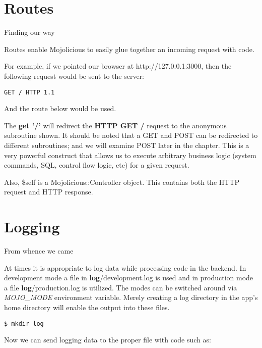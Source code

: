 \documentclass[14pt]{extreport}
\begin{document}
\section{Routes}

{\Large Finding our way}

Routes enable Mojolicious to easily glue together an incoming request with
code.

For example, if we pointed our browser at http://127.0.0.1:3000, then the
following request would be sent to the server:

\begin{lstlisting}[style=BlockStyle]
    GET / HTTP 1.1
\end{lstlisting}

And the route below would be used.



The \textbf{get '/'} will redirect the \textbf{HTTP GET /} request to the
anonymous subroutine shown. It should be noted that a GET and POST can be
redirected to different subroutines; and we will examine POST later in the
chapter.  This is a very powerful construct that allows us to execute arbitrary
business logic (system commands, SQL, control flow logic, etc) for a given
request.

Also, \$self is a Mojolicious::Controller object.  This contains both the HTTP
request and HTTP response.

\section{Logging}

{\Large From whence we came}

At times it is appropriate to log data while processing code in the backend.
In development mode a file in \textbf{log}/development.log is used and in
production mode a file \textbf{log}/production.log is utilized. The modes can
be switched around via \textit{MOJO\_MODE} environment variable. Merely
creating a log directory in the app's home directory will enable the output
into these files.

\begin{lstlisting}[style=BashInputStyle]
$ mkdir log
\end{lstlisting}

Now we can send logging data to the proper file with code such as:


\end{document}
